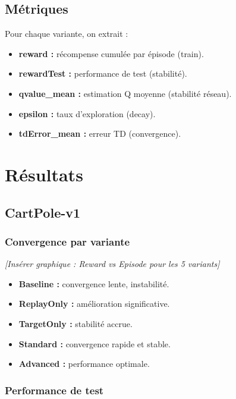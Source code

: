 \documentclass[12pt,a4paper]{article}
\begin{document}
\subsection{Métriques}

Pour chaque variante, on extrait :
\begin{itemize}
    \item \textbf{reward :} récompense cumulée par épisode (train).
    \item \textbf{rewardTest :} performance de test (stabilité).
    \item \textbf{qvalue\_mean :} estimation Q moyenne (stabilité réseau).
    \item \textbf{epsilon :} taux d'exploration (decay).
    \item \textbf{tdError\_mean :} erreur TD (convergence).
\end{itemize}

\section{Résultats}

\subsection{CartPole-v1}

\subsubsection{Convergence par variante}

\textit{[Insérer graphique : Reward vs Episode pour les 5 variants]}

\begin{itemize}
    \item \textbf{Baseline :} convergence lente, instabilité.
    \item \textbf{ReplayOnly :} amélioration significative.
    \item \textbf{TargetOnly :} stabilité accrue.
    \item \textbf{Standard :} convergence rapide et stable.
    \item \textbf{Advanced :} performance optimale.
\end{itemize}

\subsubsection{Performance de test}
\end{document}
